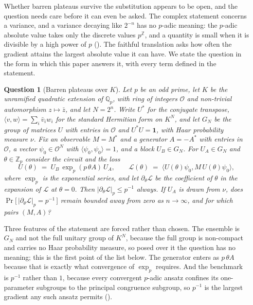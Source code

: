 \documentclass{ceurart}
\theoremstyle{plain}
\theoremstyle{definition}
\theoremstyle{remark}
\theoremstyle{plain}
\newtheorem{question}[theorem]{Question}
\newcommand{\Qp}{\mathbb{Q}_p}
\newcommand{\Zp}{\mathbb{Z}_p}
\newcommand{\padicnorm}[1]{\left|#1\right|_p}
\newcommand{\inner}[2]{\langle #1, #2\rangle}
\newcommand{\OK}{\mathcal{O}}
\newcommand{\Id}{\mathbf{1}}
\newcommand{\loss}{\mathcal{L}}
\begin{document}
Whether barren plateaus survive the substitution appears to be open, and the
question needs care before it can even be asked. The complex statement concerns
a variance, and a variance decaying like $2^{-n}$ has no $p$-adic meaning: the
$p$-adic absolute value takes only the discrete values $p^{\mathbb{Z}}$, and a
quantity is small when it is divisible by a high power of $p$
(). The faithful translation asks how often the gradient
attains the largest absolute value it can have. We state the question in the
form in which this paper answers it, with every term defined in the statement.

\begin{question}[Barren plateaus over $K$]
\label{qst:plateau}
Let $p$ be an odd prime, let $K$ be the unramified quadratic extension of $\Qp$,
with ring of integers $\OK$ and non-trivial automorphism $z\mapsto\bar z$, and
let $N=2^{n}$. Write $U^\ast$ for the conjugate transpose,
$\inner vw=\sum_i\bar v_iw_i$ for the standard Hermitian form on $K^{N}$, and
let $G_N$ be the group of matrices $U$ with entries in $\OK$ and
$U^\ast U=\Id$, with Haar probability measure $\nu$. Fix an observable
$M=M^\ast$ and a generator $A=-A^\ast$ with entries in $\OK$, a vector
$\psi_0\in\OK^{N}$ with $\inner{\psi_0}{\psi_0}=1$, and a block $U_B\in G_N$.
For $U_A\in G_N$ and $\theta\in\Zp$ consider the circuit and the loss
\[
  U(\theta)\;=\;U_B\,\exp_p(p\,\theta A)\,U_A,
  \qquad
  \loss(\theta)\;=\;\inner{U(\theta)\psi_0}{M\,U(\theta)\psi_0},
\]
where $\exp_p$ is the exponential series, and let $\partial_\theta\loss$ be
the coefficient of $\theta$ in the expansion of $\loss$ at $\theta=0$. Then
$\padicnorm{\partial_\theta\loss}\le p^{-1}$ always. If $U_A$ is drawn from
$\nu$, does
$\Pr\bigl[\,\padicnorm{\partial_\theta\loss}=p^{-1}\,\bigr]$ remain bounded
away from zero as $n\to\infty$, and for which pairs $(M,A)$?
\end{question}

Three features of the statement are forced rather than chosen. The ensemble is
$G_N$ and not the full unitary group of $K^{N}$, because the full group is
non-compact and carries no Haar probability measure, so posed over it the
question has no meaning; this is the first point of the list below. The
generator enters as $p\,\theta A$ because that is exactly what convergence of
$\exp_p$ requires. And the benchmark is $p^{-1}$ rather than $1$, because every
convergent $p$-adic ansatz confines its one-parameter subgroups to the
principal congruence subgroup, so $p^{-1}$ is the largest gradient any such
ansatz permits ().
\end{document}
